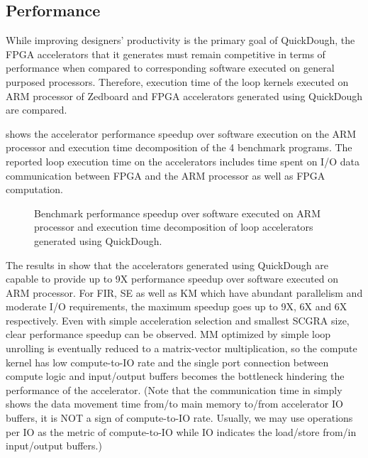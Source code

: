 \subsection{Performance} \label{subsec:acc-perf}
While improving designers' productivity is the primary goal of QuickDough, the FPGA accelerators that it generates must remain competitive in terms of performance when compared to corresponding software executed on general purposed processors. Therefore, execution time of the loop kernels executed on ARM processor of Zedboard and FPGA accelerators generated using QuickDough are compared.

 shows the accelerator performance speedup over software execution on the ARM processor and execution time decomposition of the 4 benchmark programs. The reported loop execution time on the accelerators includes time spent on I/O data communication between FPGA and the ARM processor as well as FPGA computation.

\begin{figure}
\centering
{}
\qquad
{}
\qquad
{}
\qquad
{}
\caption{Benchmark performance speedup over software executed on ARM processor and execution time 
    decomposition of loop accelerators generated using QuickDough.}
\label{fig:real-perf}
\end{figure}

The results in  show that the accelerators generated using QuickDough are 
capable to provide up to 9X performance speedup over software executed on ARM processor. For FIR, SE 
as well as KM which have abundant parallelism and moderate I/O requirements, the maximum speedup
goes up to 9X, 6X and 6X respectively. Even with simple acceleration selection and smallest SCGRA
size, clear performance speedup can be observed. MM optimized by simple loop unrolling is eventually reduced to
a matrix-vector multiplication, so the compute kernel has low compute-to-IO rate and the single port
connection between compute logic and input/output buffers becomes the bottleneck hindering
the performance of the accelerator. (Note that the communication time in  simply shows the data movement time from/to main memory to/from accelerator IO buffers, it is NOT a sign of compute-to-IO rate. Usually, we may use operations per IO as the metric of compute-to-IO while IO indicates the load/store from/in input/output buffers.)

